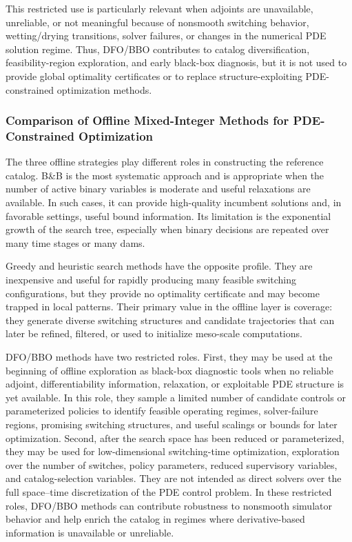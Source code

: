 \documentclass{article}
\newcommand{\1}{\mathds{1}}          %
\theoremstyle{definition}
\begin{document}
\begin{sloppypar}
This restricted use is particularly relevant when adjoints are unavailable, unreliable, or
not meaningful because of nonsmooth switching behavior, wetting/drying transitions, solver
failures, or changes in the numerical PDE solution regime. Thus, DFO/BBO contributes to
catalog diversification, feasibility-region exploration, and early black-box diagnosis, but it
is not used to provide global optimality certificates or to replace structure-exploiting
PDE-constrained optimization methods.






\subsubsection{Comparison of Offline Mixed-Integer Methods for PDE-Constrained Optimization}


The three offline strategies play different roles in constructing the reference catalog.
B\&B is the most systematic approach and is appropriate when the number of active binary
variables is moderate and useful relaxations are available. In such cases, it can provide
high-quality incumbent solutions and, in favorable settings, useful bound information.
Its limitation is the exponential growth of the search tree, especially when binary decisions
are repeated over many time stages or many dams.

Greedy and heuristic search methods have the opposite profile. They are inexpensive and
useful for rapidly producing many feasible switching configurations, but they provide no
optimality certificate and may become trapped in local patterns. Their primary value in the
offline layer is coverage: they generate diverse switching structures and candidate trajectories
that can later be refined, filtered, or used to initialize meso-scale computations.

DFO/BBO methods have two restricted roles. First, they may be used at the beginning
of offline exploration as black-box diagnostic tools when no reliable adjoint,
differentiability information, relaxation, or exploitable PDE structure is yet available.
In this role, they sample a limited number of candidate controls or parameterized policies
to identify feasible operating regimes, solver-failure regions, promising switching
structures, and useful scalings or bounds for later optimization. Second, after the search
space has been reduced or parameterized, they may be used for low-dimensional
switching-time optimization, exploration over the number of switches, policy parameters,
reduced supervisory variables, and catalog-selection variables. They are not intended as
direct solvers over the full space--time discretization of the PDE control problem. In
these restricted roles, DFO/BBO methods can contribute robustness to nonsmooth simulator
behavior and help enrich the catalog in regimes where derivative-based information is
unavailable or unreliable.


\end{sloppypar}
\end{document}
